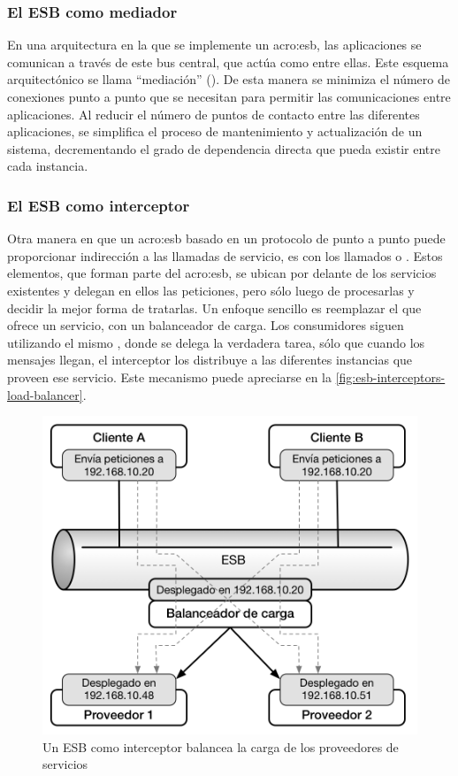 \subsubsection{El ESB como mediador}

En una arquitectura en la que se implemente un \gls{acro:esb}, las aplicaciones se comunican a través de este bus central, que actúa como  entre ellas. Este esquema arquitectónico se llama ``mediación'' (). De esta manera se minimiza el número de conexiones punto a punto que se necesitan para permitir las comunicaciones entre aplicaciones. Al reducir el número de puntos de contacto entre las diferentes aplicaciones, se simplifica el proceso de mantenimiento y actualización de un sistema, decrementando el grado de dependencia directa que pueda existir entre cada instancia.


\subsubsection{El ESB como interceptor}

Otra manera en que un \gls{acro:esb} basado en un protocolo de punto a punto puede proporcionar indirección a las llamadas de servicio, es con los llamados  o . Estos elementos, que forman parte del \gls{acro:esb}, se ubican por delante de los servicios existentes y delegan en ellos las peticiones, pero sólo luego de procesarlas y decidir la mejor forma de tratarlas. Un enfoque sencillo es reemplazar el  que ofrece un servicio, con un balanceador de carga. Los consumidores siguen utilizando el mismo , donde se delega la verdadera tarea, sólo que cuando los mensajes llegan, el interceptor los distribuye a las diferentes instancias que proveen ese servicio\cite[p.~52]{josuttis2007}. Este mecanismo puede apreciarse en la \autoref{fig:esb-interceptors-load-balancer}.

\begin{figure}[H]
  \includegraphics[width=\linewidth]{src/images/02-capitulo-2/esb-interceptor.png}
  \caption{Un ESB como interceptor balancea la carga de los proveedores de servicios}
  \label{fig:esb-interceptors-load-balancer}
\end{figure}

